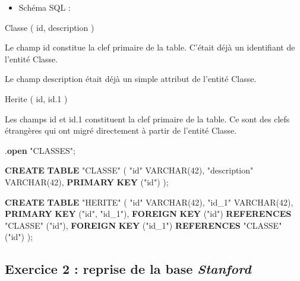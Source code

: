 \documentclass[11pt]{article}
\providecommand{\tightlist}{%
      \setlength{\itemsep}{0pt}\setlength{\parskip}{0pt}}
\newenvironment{Shaded}{}{}
\newcommand{\KeywordTok}[1]{\textcolor[rgb]{0.00,0.44,0.13}{\textbf{{#1}}}}
\newcommand{\DataTypeTok}[1]{\textcolor[rgb]{0.56,0.13,0.00}{{#1}}}
\newcommand{\DecValTok}[1]{\textcolor[rgb]{0.25,0.63,0.44}{{#1}}}
\newcommand{\OtherTok}[1]{\textcolor[rgb]{0.00,0.44,0.13}{{#1}}}
\newcommand{\NormalTok}[1]{{#1}}
\begin{document}
\begin{itemize}
\tightlist
\item
  Schéma SQL :
\end{itemize}

{Classe} ( {id}, {description} )

Le champ id constitue la clef primaire de la table. C'était déjà un
identifiant de l'entité Classe.

Le champ description était déjà un simple attribut de l'entité Classe.

{Herite} ( {id}, {id.1} )

Les champs id et id.1 constituent la clef primaire de la table. Ce sont
des clefs étrangères qui ont migré directement à partir de l'entité
Classe.

\begin{Shaded}
\begin{Highlighting}[]
\NormalTok{.}\KeywordTok{open} \OtherTok{"CLASSES"}\NormalTok{;}

\KeywordTok{CREATE} \KeywordTok{TABLE} \OtherTok{"CLASSE"}\NormalTok{ (}
  \OtherTok{"id"} \DataTypeTok{VARCHAR}\NormalTok{(}\DecValTok{42}\NormalTok{),}
  \OtherTok{"description"} \DataTypeTok{VARCHAR}\NormalTok{(}\DecValTok{42}\NormalTok{),}
  \KeywordTok{PRIMARY} \KeywordTok{KEY}\NormalTok{ (}\OtherTok{"id"}\NormalTok{)}
\NormalTok{);}

\KeywordTok{CREATE} \KeywordTok{TABLE} \OtherTok{"HERITE"}\NormalTok{ (}
  \OtherTok{"id"} \DataTypeTok{VARCHAR}\NormalTok{(}\DecValTok{42}\NormalTok{),}
  \OtherTok{"id\_1"} \DataTypeTok{VARCHAR}\NormalTok{(}\DecValTok{42}\NormalTok{),}
  \KeywordTok{PRIMARY} \KeywordTok{KEY}\NormalTok{ (}\OtherTok{"id"}\NormalTok{, }\OtherTok{"id\_1"}\NormalTok{),}
  \KeywordTok{FOREIGN} \KeywordTok{KEY}\NormalTok{ (}\OtherTok{"id"}\NormalTok{) }\KeywordTok{REFERENCES} \OtherTok{"CLASSE"}\NormalTok{ (}\OtherTok{"id"}\NormalTok{),}
  \KeywordTok{FOREIGN} \KeywordTok{KEY}\NormalTok{ (}\OtherTok{"id\_1"}\NormalTok{) }\KeywordTok{REFERENCES} \OtherTok{"CLASSE"}\NormalTok{ (}\OtherTok{"id"}\NormalTok{)}
\NormalTok{);}
\end{Highlighting}
\end{Shaded}

    \hypertarget{exercice-2-reprise-de-la-base-stanford}{%
\subsection{\texorpdfstring{Exercice 2 : reprise de la base
\emph{Stanford}}{Exercice 2 : reprise de la base Stanford}}\label{exercice-2-reprise-de-la-base-stanford}}
\end{document}
